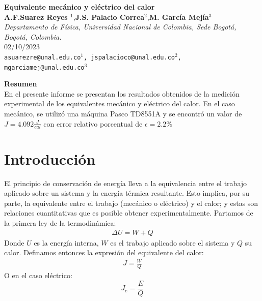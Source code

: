 \documentclass{article}
\date{}
\begin{document}
 
     \begin{center}
        {\Large \textbf{Equivalente mecánico y eléctrico del calor}}\\
        \vspace{5mm}
        {\small \textbf{A.F.Suarez Reyes $^{1}$},\textbf{J.S. Palacio Correa$^{2}$},\textbf{M. García Mejía$^{3}$} \\
        \vspace{3mm}}
        {\small \textit{Departamento de Física, Universidad Nacional de Colombia, Sede Bogotá, Bogotá, Colombia.}}\\
        \vspace{3mm}
        {\small 02/10/2023}\\
        \vspace{3mm}
        {\texttt{\textup{asuarezre@unal.edu.co$^{1}$, jspalacioco@unal.edu.co$^2$, mgarciamej@unal.edu.co$^{3}$}}} \\
    \end{center}
    
    
    \vspace{5mm}

{\large \textbf{Resumen}}\\
En el presente informe se presentan los resultados obtenidos de la medición experimental de los equivalentes mecánico y eléctrico del calor. En el caso mecánico, se utilizó una máquina Pasco TD8551A y se encontró un valor de $J = 4.092 \frac{J}{cal}$ con error relativo porcentual de $\epsilon = 2.2\%$

 \textit{ \hspace{2mm}}

\section{Introducción}
El principio de conservación de energía lleva a la equivalencia entre el trabajo aplicado sobre un sistema y la energía térmica resultante. Esto implica, por su parte, la equivalente entre el trabajo (mecánico o eléctrico) y el calor; y estas son relaciones cuantitativas que es posible obtener experimentalmente. Partamos de la primera ley de la termodinámica:
\begin{align}
    \Delta U = W + Q
\end{align}
Donde $U$ es la energía interna, $W$ es el trabajo aplicado sobre el sistema y $Q$ su calor. Definamos entonces la expresión del equivalente del calor:
\begin{align}
    J =  \frac{W}{Q}
\end{align}
O en el caso eléctrico:
\begin{equation}
    J_e=\frac{E}{Q}
\end{equation}
\end{document}
